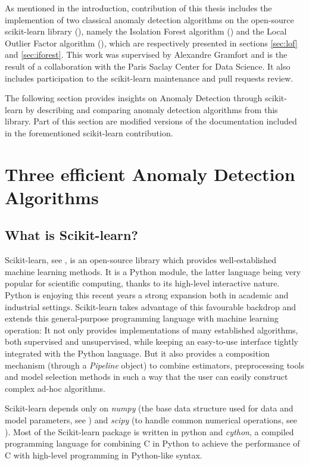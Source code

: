 As mentioned in the introduction, contribution of this thesis includes the implemention of two classical anomaly detection algorithms on the open-source scikit-learn library (\cite{sklearn2011}), namely the Isolation Forest algorithm (\cite{Liu2008}) and the Local Outlier Factor algorithm (\cite{Breunig2000LOF}), which are respectively presented in sections \ref{sec:lof} and \ref{sec:iforest}. This work was supervised by Alexandre Gramfort and is the result of a collaboration with the Paris Saclay Center for Data Science. It also includes participation to the scikit-learn maintenance and pull requests review.

The following section provides insights on Anomaly Detection through scikit-learn by describing and comparing anomaly detection algorithms from this library. Part of this section are modified versions of the documentation included in the forementioned scikit-learn contribution.

\section{Three efficient Anomaly Detection Algorithms}
\label{sec:AD_sklearn}

\subsection{What is Scikit-learn?}
Scikit-learn, see \cite{sklearn2011}, is an open-source library which provides well-established machine learning methods.
It is a Python module, the latter language being very popular for scientific computing, thanks to its high-level interactive nature. Python is enjoying this recent years a strong expansion both in academic and industrial settings. Scikit-learn takes advantage of this favourable backdrop and extends this general-purpose programming language with machine learning operation: It not only provides implementations of many established algorithms, both supervised and unsupervised, while keeping an easy-to-use interface tightly integrated with the Python language. But it also provides a composition mechanism (through a \emph{Pipeline} object) to combine estimators, preprocessing tools and model selection methods in such a way that the user can easily construct complex ad-hoc algorithms.

Scikit-learn depends only on \emph{numpy} (the base data structure used for data and model parameters, see \cite{Vanderwalt2011numpy}) and \emph{scipy} (to handle common numerical operations, see \cite{Jones2015scipy}).
Most of the Scikit-learn package is written in python and \emph{cython}, a compiled programming language for combining C in Python to achieve the performance of C with high-level programming in Python-like syntax.


